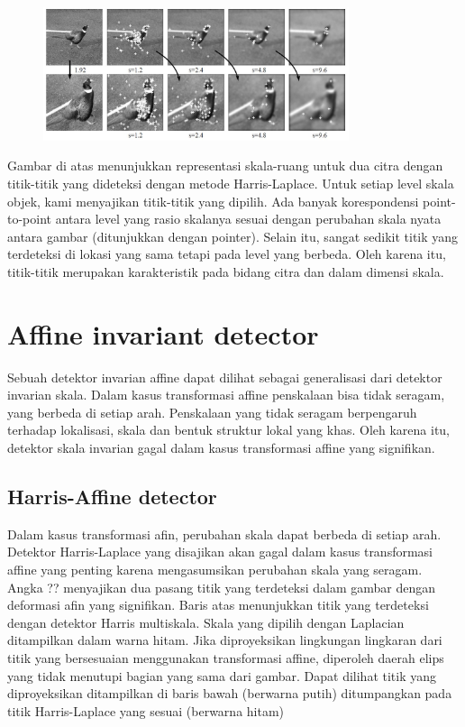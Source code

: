 \begin{figure}
  \centering{}
  \includegraphics[width=0.8\textwidth]{gambar/Point detect.jpg}
  \caption{}
\end{figure}

Gambar di atas menunjukkan representasi skala-ruang untuk dua citra dengan titik-titik yang dideteksi dengan metode Harris-Laplace. Untuk setiap level skala objek, kami menyajikan titik-titik yang dipilih. Ada banyak korespondensi point-to-point antara level yang rasio skalanya sesuai dengan perubahan skala nyata antara gambar (ditunjukkan dengan pointer). Selain itu, sangat sedikit titik yang terdeteksi di lokasi yang sama tetapi pada level yang berbeda. Oleh karena itu, titik-titik merupakan karakteristik pada bidang citra dan dalam dimensi skala.

\section{Affine invariant detector}
Sebuah detektor invarian affine dapat dilihat sebagai generalisasi dari detektor invarian skala. Dalam kasus transformasi affine penskalaan bisa tidak seragam, yang berbeda di setiap arah. Penskalaan yang tidak seragam berpengaruh terhadap lokalisasi, skala dan bentuk struktur lokal yang khas. Oleh karena itu, detektor skala invarian gagal dalam kasus transformasi affine yang signifikan.

\subsection{Harris-Affine detector}
Dalam kasus transformasi afin, perubahan skala dapat berbeda di setiap arah. Detektor Harris-Laplace yang disajikan akan gagal dalam kasus transformasi affine yang penting karena mengasumsikan perubahan skala yang seragam. Angka ?? menyajikan dua pasang titik yang terdeteksi dalam gambar dengan deformasi afin yang signifikan. Baris atas menunjukkan titik yang terdeteksi dengan detektor Harris multiskala. Skala yang dipilih dengan Laplacian ditampilkan dalam warna hitam. Jika diproyeksikan lingkungan lingkaran dari titik yang bersesuaian menggunakan transformasi affine, diperoleh daerah elips yang tidak menutupi bagian yang sama dari gambar. Dapat dilihat titik yang diproyeksikan ditampilkan di baris bawah (berwarna putih) ditumpangkan pada titik Harris-Laplace yang sesuai (berwarna hitam)

